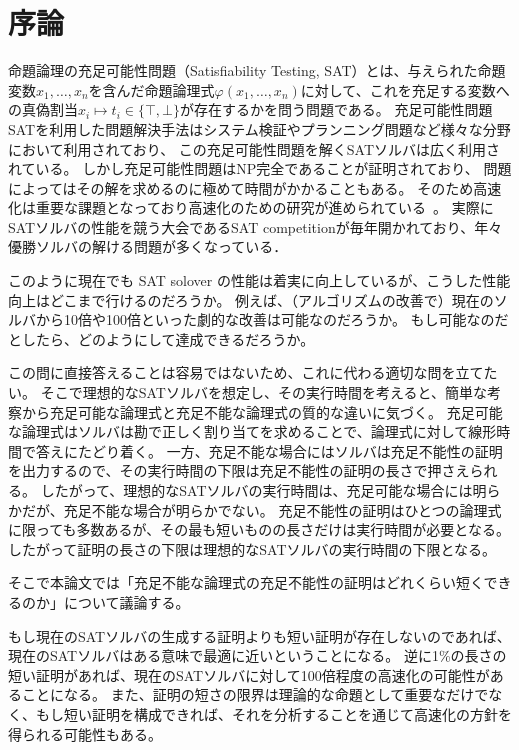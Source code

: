 \section{序論}
命題論理の充足可能性問題（Satisfiability Testing, SAT）とは、与えられた命題変数\( x_1,\dots,x_n \)を含んだ命題論理式\( \varphi(x_1,\dots,x_n) \)に対して、これを充足する変数への真偽割当\( x_i \mapsto t_i \in \{ \top, \bot \} \)が存在するかを問う問題である。
充足可能性問題SATを利用した問題解決手法はシステム検証やプランニング問題など様々な分野において利用されており、
この充足可能性問題を解くSATソルバは広く利用されている\cite{PracticalExample}。
しかし充足可能性問題はNP完全であることが証明されており\cite{Cook}、
問題によってはその解を求めるのに極めて時間がかかることもある。
そのため高速化は重要な課題となっており高速化のための研究が進められている~\cite{glucose,Chaff,BerkMin,MINISAT,kissat,neuralnet-vs-random-VSIDS}。
実際にSATソルバの性能を競う大会であるSAT competitionが毎年開かれており、年々優勝ソルバの解ける問題が多くなっている．

このように現在でも SAT solover の性能は着実に向上しているが、こうした性能向上はどこまで行けるのだろうか。
例えば、（アルゴリズムの改善で）現在のソルバから10倍や100倍といった劇的な改善は可能なのだろうか。
もし可能なのだとしたら、どのようにして達成できるだろうか。

この問に直接答えることは容易ではないため、これに代わる適切な問を立てたい。
そこで理想的なSATソルバを想定し、その実行時間を考えると、簡単な考察から充足可能な論理式と充足不能な論理式の質的な違いに気づく。
充足可能な論理式はソルバは勘で正しく割り当てを求めることで、論理式に対して線形時間で答えにたどり着く。
一方、充足不能な場合にはソルバは充足不能性の証明を出力するので、その実行時間の下限は充足不能性の証明の長さで押さえられる。
したがって、理想的なSATソルバの実行時間は、充足可能な場合には明らかだが、充足不能な場合が明らかでない。
充足不能性の証明はひとつの論理式に限っても多数あるが、その最も短いものの長さだけは実行時間が必要となる。
したがって証明の長さの下限は理想的なSATソルバの実行時間の下限となる。 

そこで本論文では「充足不能な論理式の充足不能性の証明はどれくらい短くできるのか」について議論する。
\begin{comment}
    さらに、短い証明を作ることは、ソルバの性能の限界に関する間接的な答えを与えることができる。
    SAT solverは充足不能な命題に対して充足不能性の証明を与えるため、
\end{comment}
もし現在のSATソルバの生成する証明よりも短い証明が存在しないのであれば、
現在のSATソルバはある意味で最適に近いということになる。
逆に1\%の長さの短い証明があれば、現在のSATソルバに対して100倍程度の高速化の可能性があることになる。
また、証明の短さの限界は理論的な命題として重要なだけでなく、もし短い証明を構成できれば、それを分析することを通じて高速化の方針を得られる可能性もある。

